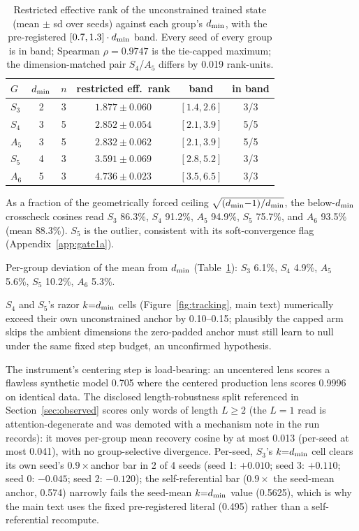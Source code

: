 \begin{table}[h]
\centering
\small
\begin{tabular}{lccccc}
\toprule
$G$ & $d_{\min}$ & $n$ & restricted eff.\ rank & band & in band \\
\midrule
$S_3$ & 2 & 3 & $1.877 \pm 0.060$ & $[1.4, 2.6]$ & 3/3 \\
$S_4$ & 3 & 5 & $2.852 \pm 0.054$ & $[2.1, 3.9]$ & 5/5 \\
$A_5$ & 3 & 5 & $2.832 \pm 0.062$ & $[2.1, 3.9]$ & 5/5 \\
$S_5$ & 4 & 3 & $3.591 \pm 0.069$ & $[2.8, 5.2]$ & 3/3 \\
$A_6$ & 5 & 3 & $4.736 \pm 0.023$ & $[3.5, 6.5]$ & 3/3 \\
\bottomrule
\end{tabular}
\caption{Restricted effective rank of the unconstrained trained state
(mean $\pm$ sd over seeds) against each group's $d_{\min}$, with the
pre-registered $[0.7, 1.3] \cdot d_{\min}$ band. Every seed of every group is
in band; Spearman $\rho = 0.9747$ is the tie-capped maximum; the
dimension-matched pair $S_4$/$A_5$ differs by 0.019 rank-units.}
\label{tab:m1}
\end{table}

As a fraction of the geometrically forced ceiling
$\sqrt{(d_{\min}{-}1)/d_{\min}}$, the below-$d_{\min}$ crosscheck cosines read
$S_3$ 86.3\%, $S_4$ 91.2\%, $A_5$ 94.9\%, $S_5$ 75.7\%, and $A_6$
93.5\% (mean 88.3\%). $S_5$ is the outlier, consistent with its
soft-convergence flag (Appendix~\ref{app:gate1a}).

Per-group deviation of the mean from $d_{\min}$ (Table~\ref{tab:m1}):
$S_3$ 6.1\%, $S_4$ 4.9\%, $A_5$ 5.6\%, $S_5$ 10.2\%, $A_6$ 5.3\%.

$S_4$ and $S_5$'s razor $k{=}d_{\min}$ cells (Figure~\ref{fig:tracking},
main text) numerically exceed their own unconstrained anchor by 0.10--0.15;
plausibly the capped arm skips the ambient dimensions the zero-padded
anchor must still learn to null under the same fixed step budget, an
unconfirmed hypothesis.

The instrument's centering step is load-bearing: an uncentered lens
scores a flawless synthetic model 0.705 where the centered production
lens scores 0.9996 on identical data.
The disclosed length-robustness split referenced in
Section~\ref{sec:observed} scores only words of length $L \geq 2$ (the
$L = 1$ read is attention-degenerate and was demoted with a mechanism
note in the run records): it moves per-group mean recovery cosine by at
most 0.013 (per-seed at most 0.041), with no group-selective divergence.
Per-seed, $S_3$'s $k{=}d_{\min}$ cell clears its own seed's $0.9\times$anchor
bar in 2 of 4 seeds (seed 1: $+0.010$; seed 3: $+0.110$; seed 0: $-0.045$;
seed 2: $-0.120$); the self-referential bar ($0.9\times$ the seed-mean
anchor, 0.574) narrowly fails the seed-mean $k{=}d_{\min}$ value (0.5625),
which is why the main text uses the fixed pre-registered literal (0.495)
rather than a self-referential recompute.


